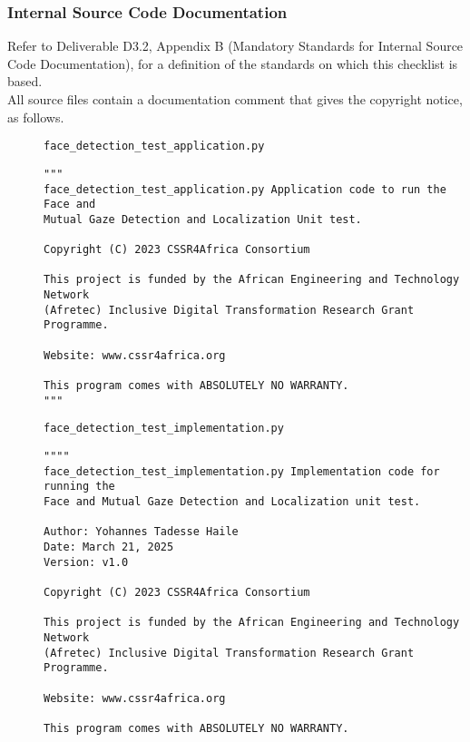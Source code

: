 \documentclass{CSSRforAfrica}
\newcommand{\blank}{~\\}
\newcommand{\checkboxChecked}{\fbox{\ding{51}}} %
\begin{document}
 \newpage
\subsubsection{Internal Source Code Documentation}
\label{subsubsection:face_detection_test_documentation_standards}  
 
Refer to Deliverable D3.2, Appendix B (Mandatory Standards for Internal Source Code Documentation), for a definition of the standards on which this checklist is based.\\

\noindent All source files contain a documentation comment that gives the copyright notice, as follows.
 
\begin{description}

\item[\checkboxChecked] {\small \verb+face_detection_test_application.py+}  
{\small \begin{verbatim}
"""
face_detection_test_application.py Application code to run the Face and 
Mutual Gaze Detection and Localization Unit test.

Copyright (C) 2023 CSSR4Africa Consortium

This project is funded by the African Engineering and Technology Network 
(Afretec) Inclusive Digital Transformation Research Grant Programme.

Website: www.cssr4africa.org

This program comes with ABSOLUTELY NO WARRANTY.
"""

\end{verbatim} }

\item[\checkboxChecked]  {\small \verb+face_detection_test_implementation.py+}  
{\small \begin{verbatim}
""""
face_detection_test_implementation.py Implementation code for running the 
Face and Mutual Gaze Detection and Localization unit test.

Author: Yohannes Tadesse Haile
Date: March 21, 2025
Version: v1.0

Copyright (C) 2023 CSSR4Africa Consortium

This project is funded by the African Engineering and Technology Network 
(Afretec) Inclusive Digital Transformation Research Grant Programme.

Website: www.cssr4africa.org

This program comes with ABSOLUTELY NO WARRANTY.
\end{verbatim} }

\end{description} 
\end{document}
